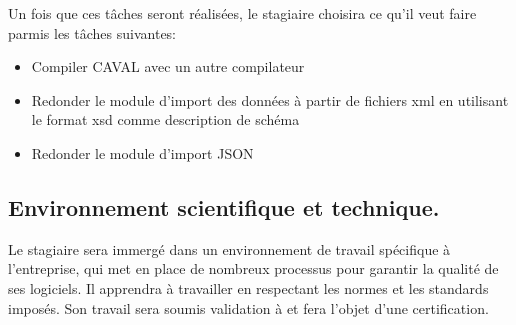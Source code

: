 \documentclass[init,francais]{rapportPFE}  %
\begin{document}
Un fois que ces tâches seront réalisées, le stagiaire choisira ce qu'il veut faire parmis les tâches suivantes:
\begin{itemize}
  \item Compiler CAVAL avec un autre compilateur
  \item Redonder le module d'import des données à partir de fichiers xml en utilisant le format xsd comme description de schéma
  \item Redonder le module d'import JSON
\end{itemize}



\subsection{Environnement scientifique et technique.}
Le stagiaire sera immergé dans un environnement de travail spécifique à l'entreprise, 
qui met en place de nombreux processus pour garantir la qualité de ses logiciels. 
Il apprendra à travailler en respectant les normes et les standards imposés. Son travail sera soumis validation à et fera l'objet d'une certification.



% 
% 
\end{document}
